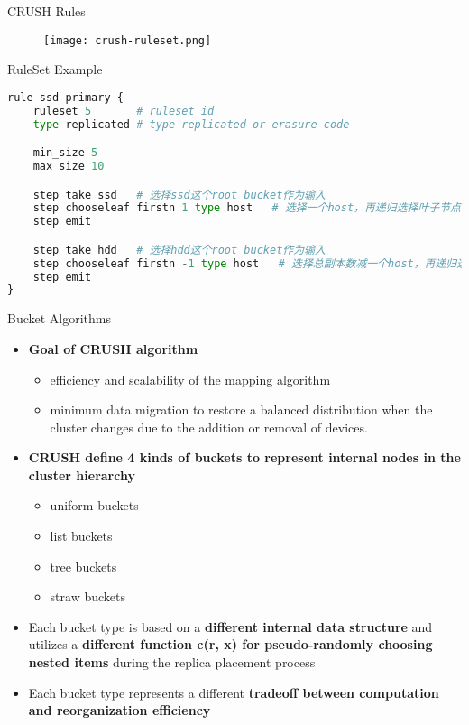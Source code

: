 \begin{frame}{CRUSH Rules}
    \begin{figure}[htpb]
        \centering
        \texttt{[image: crush-ruleset.png]}
    \end{figure}
\end{frame}

\begin{frame}[fragile]{RuleSet Example}
\begin{lstlisting}[language=python]
rule ssd-primary {
    ruleset 5       # ruleset id
    type replicated # type replicated or erasure code

    min_size 5
    max_size 10

    step take ssd   # 选择ssd这个root bucket作为输入
    step chooseleaf firstn 1 type host   # 选择一个host，再递归选择叶子节点的osd
    step emit

    step take hdd   # 选择hdd这个root bucket作为输入
    step chooseleaf firstn -1 type host   # 选择总副本数减一个host，再递归选择叶子节点的osd
    step emit
}
\end{lstlisting}
\end{frame}

\begin{frame}{Bucket Algorithms}
    \begin{itemize}
        \item \textbf{Goal of CRUSH algorithm}
            \begin{itemize}
                \item efficiency and scalability of the mapping algorithm
                \item minimum data migration to restore a balanced distribution when the cluster changes due to the addition or removal of devices.
            \end{itemize}
        \item \textbf{CRUSH define 4 kinds of buckets to represent internal nodes in the cluster hierarchy}
            \begin{itemize}
                \item uniform buckets
                \item list buckets
                \item tree buckets
                \item straw buckets
            \end{itemize}
        \item Each bucket type is based on a \textbf{different internal data structure} and utilizes a \textbf{different function c(r, x) for pseudo-randomly choosing nested items} during the replica placement process
        \item Each bucket type represents a different \textbf{tradeoff between computation and reorganization efficiency}
    \end{itemize}
\end{frame}

